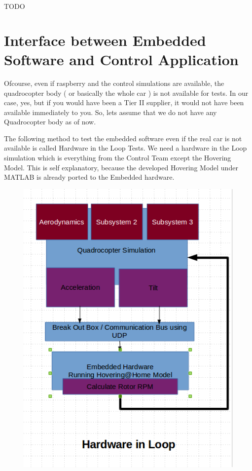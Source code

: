 \documentclass[a4paper,11pt]{article}
\begin{document}
TODO


\pagebreak
\section{Interface between Embedded Software and Control Application }

Ofcourse, even if raspberry and the control simulations are available, the quadrocopter body ( or basically the whole car ) is not available for tests. In our case, yes, but if you would have been a Tier II supplier, it would not have been available immediately to you. So, lets assume that we do not have any Quadrocopter body as of now.

The following method to test the embedded software even if the real car is not available is called Hardware in the Loop Tests. We need a hardware in the Loop simulation which is everything from the Control Team except the Hovering Model. This is self explanatory, because the developed Hovering Model under MATLAB is already ported to the Embedded hardware.

\begin{figure}[ht]
\centering
\includegraphics[scale=0.5]{pics/Interface-Control-Embedded.png}
\end{figure}
\end{document}
